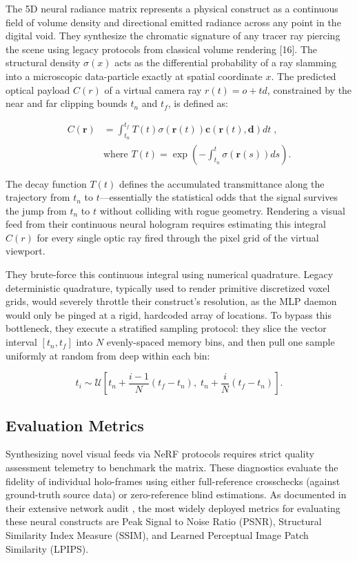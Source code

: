 The 5D neural radiance matrix represents a physical construct as a continuous field of volume density and directional emitted radiance across any point in the digital void. They synthesize the chromatic signature of any tracer ray piercing the scene using legacy protocols from classical volume rendering [16]. The structural density $\sigma(x)$ acts as the differential probability of a ray slamming into a microscopic data-particle exactly at spatial coordinate $x$. The predicted optical payload $C(r)$ of a virtual camera ray $r(t) = o+td$, constrained by the near and far clipping bounds $t_n$ and $t_f$, is defined as:

\begin{equation}
\begin{split}
C(\mathbf{r}) &= \int_{t_n}^{t_f} T(t) \sigma(\mathbf{r}(t)) \mathbf{c}(\mathbf{r}(t), \mathbf{d}) dt \;, \\
&\text{where } T(t) = \exp\left( - \int_{t_n}^{t} \sigma(\mathbf{r}(s)) ds \right) .
\end{split}
\end{equation}

The decay function $T(t)$ defines the accumulated transmittance along the trajectory from $t_n$ to $t$---essentially the statistical odds that the signal survives the jump from $t_n$ to $t$ without colliding with rogue geometry. Rendering a visual feed from their continuous neural hologram requires estimating this integral $C(r)$ for every single optic ray fired through the pixel grid of the virtual viewport.

They brute-force this continuous integral using numerical quadrature. Legacy deterministic quadrature, typically used to render primitive discretized voxel grids, would severely throttle their construct's resolution, as the MLP daemon would only be pinged at a rigid, hardcoded array of locations. To bypass this bottleneck, they execute a stratified sampling protocol: they slice the vector interval $[t_n,t_f]$ into $N$ evenly-spaced memory bins, and then pull one sample uniformly at random from deep within each bin:

\begin{equation}
t_i \sim \mathcal{U} \left[ t_n + \frac{i-1}{N}(t_f - t_n), \; t_n + \frac{i}{N}(t_f - t_n) \right] .
\end{equation}

\subsection{Evaluation Metrics}
Synthesizing novel visual feeds via NeRF protocols requires strict quality assessment telemetry to benchmark the matrix. These diagnostics evaluate the fidelity of individual holo-frames using either full-reference crosschecks (against ground-truth source data) or zero-reference blind estimations. As documented in their extensive network audit \cite{rabby2024beyondpixels}, the most widely deployed metrics for evaluating these neural constructs are Peak Signal to Noise Ratio (PSNR), Structural Similarity Index Measure (SSIM), and Learned Perceptual Image Patch Similarity (LPIPS).


